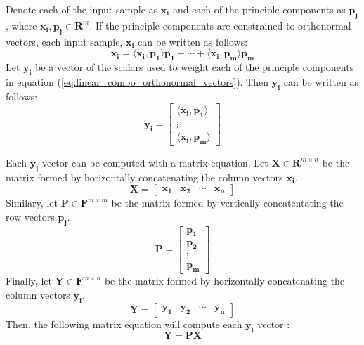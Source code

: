 \documentclass[conference]{IEEEtran}
\begin{document}
    Denote each of the input sample as $\mathbf{x_i}$ and each of the principle components as $\mathbf{p_j}$, where $\mathbf{x_i}, \mathbf{p_j} \in \mathbf{R}^{m}$. If the principle components are constrained to orthonormal vectors, each input sample, $\mathbf{x_i}$ can be written as follows:
    \begin{equation}
    		\mathbf{x_i} = \langle \mathbf{x_i}, \mathbf{p_1} \rangle \mathbf{p_1} + \cdots + \langle \mathbf{x_i}, \mathbf{p_m} \rangle \mathbf{p_m}
    		\label{eq:linear_combo_orthonormal_vectors}
    	\end{equation}
    	Let $\mathbf{y_i}$ be a vector of the scalars used to weight each of the principle components in equation (\ref{eq:linear_combo_orthonormal_vectors}). Then $\mathbf{y_i}$ can be written as follows:
    	\begin{equation}
        \mathbf{y_i} = \begin{bmatrix}
                        \langle \mathbf{x_i}, \mathbf{p_1} \rangle\\
                        \vdots \\
                        \langle \mathbf{x_i}, \mathbf{p_m}\rangle
                        \end{bmatrix}
    \end{equation}
    
    	Each $\mathbf{y_i}$ vector can be computed with a matrix equation. Let $\mathbf{X} \in \mathbf{R}^{m \times n}$ be the matrix formed by horizontally concatenating the column vectors $\mathbf{x_i}$.
    \begin{equation}
    		\mathbf{X} = \begin{bmatrix}
    			\mathbf{x_1} & \mathbf{x_2} & \cdots & \mathbf{x_n}
    		\end{bmatrix}
    	\end{equation}
    	Similary, let $\mathbf{P} \in \mathbf{F}^{m \times m}$ be the matrix formed by vertically concatentating the row vectors $\mathbf{p_j}$.
	\begin{equation}
    		\mathbf{P} = \begin{bmatrix}
    			\mathbf{p_1} \\ \mathbf{p_2} \\ \vdots \\ \mathbf{p_m}
    		\end{bmatrix}
    	\end{equation}
    	Finally, let $\mathbf{Y} \in \mathbf{F}^{m \times n}$ be the matrix formed by horizontally concatenating the column vectors $\mathbf{y_i}$.
    \begin{equation}
    		\mathbf{Y} = \begin{bmatrix}
    			\mathbf{y_1} & \mathbf{y_2} & \cdots & \mathbf{y_n}
    		\end{bmatrix}
    	\end{equation}
    	Then, the following matrix equation will compute each $\mathbf{y_i}$ vector \cite{shlens_2014_tutorial}:
    	\begin{equation}
    		\mathbf{Y} = \mathbf{P}\mathbf{X}
    	\end{equation}
\end{document}
